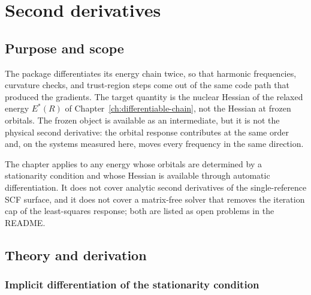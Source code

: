 \chapter{Second derivatives}
\label{ch:second-derivatives}

\section{Purpose and scope}

The package differentiates its energy chain twice, so that harmonic
frequencies, curvature checks, and trust-region steps come out of the
same code path that produced the gradients.  The target quantity is the
nuclear Hessian of the relaxed energy $E^{*}(R)$ of
Chapter~\ref{ch:differentiable-chain}, not the Hessian at frozen
orbitals.  The frozen object is available as an intermediate, but it is
not the physical second derivative: the orbital response contributes at
the same order and, on the systems measured here, moves every frequency
in the same direction.

The chapter applies to any energy whose orbitals are determined by a
stationarity condition and whose Hessian is available through
automatic differentiation.  It does not cover analytic second
derivatives of the single-reference SCF surface, and it does not cover
a matrix-free solver that removes the iteration cap of the
least-squares response; both are listed as open problems in the
README.

\section{Theory and derivation}
\label{sec:hessian-theory}

\subsection{Implicit differentiation of the stationarity condition}

